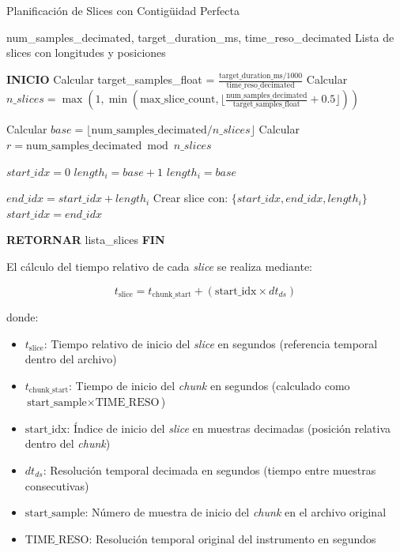 \begin{algorithm}[H]
\caption{Planificación de Slices con Contigüidad Perfecta}
\label{alg:slice-planning}
\begin{algorithmic}[1]
\Require num\_samples\_decimated, target\_duration\_ms, time\_reso\_decimated
\Ensure Lista de slices con longitudes y posiciones

\State \textbf{INICIO}
\State Calcular target\_samples\_float = $\frac{\text{target\_duration\_ms}/1000}{\text{time\_reso\_decimated}}$
\State Calcular $n\_slices = \max(1, \min(\text{max\_slice\_count}, \lfloor\frac{\text{num\_samples\_decimated}}{\text{target\_samples\_float}} + 0.5\rfloor))$

\State Calcular $base = \lfloor \text{num\_samples\_decimated} / n\_slices \rfloor$
\State Calcular $r = \text{num\_samples\_decimated} \bmod n\_slices$

\State $start\_idx = 0$
        \State $length_i = base + 1$ 
    \Else
        \State $length_i = base$ 
    \EndIf
    
    \State $end\_idx = start\_idx + length_i$
    \State Crear slice con: $\{start\_idx, end\_idx, length_i\}$
    \State $start\_idx = end\_idx$ 
\EndFor

\State \textbf{RETORNAR} lista\_slices
\State \textbf{FIN}
\end{algorithmic}
\end{algorithm}

El cálculo del tiempo relativo de cada \emph{slice} se realiza mediante:

\[
t_{\text{slice}} = t_{\text{chunk\_start}} + (\text{start\_idx} \times dt_{ds})
\]

donde:
\begin{itemize}
    \item $t_{\text{slice}}$: Tiempo relativo de inicio del \emph{slice} en segundos (referencia temporal dentro del archivo)
    \item $t_{\text{chunk\_start}}$: Tiempo de inicio del \emph{chunk} en segundos (calculado como $\text{start\_sample} \times \text{TIME\_RESO}$)
    \item $\text{start\_idx}$: Índice de inicio del \emph{slice} en muestras decimadas (posición relativa dentro del \emph{chunk})
    \item $dt_{ds}$: Resolución temporal decimada en segundos (tiempo entre muestras consecutivas)
    \item $\text{start\_sample}$: Número de muestra de inicio del \emph{chunk} en el archivo original
    \item $\text{TIME\_RESO}$: Resolución temporal original del instrumento en segundos
\end{itemize}

